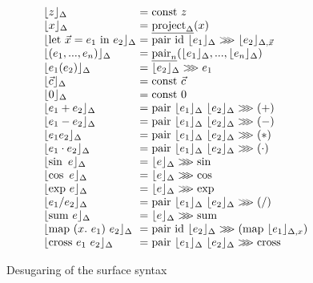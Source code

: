 \documentclass[preprint]{sigplanconf}
\newcommand{\comp}{\mathrel{>\kern-0.45em>\kern-0.45em>}}
\newcommand{\elab}[1]{\lfloor #1 \rfloor}
\theoremstyle{examplestyle}
\begin{document}
\begin{figure}
  \centering
  \begin{displaymath}
    \begin{array}{l@{\hspace{0.3em}}c@{\hspace{0.3em}}l}
      \elab{z}_\Delta & = & \mathrm{const}~z \\
      \elab{x}_\Delta & = & \underline{\mathrm{project}_\Delta}(x) \\
      \elab{\mathrm{let}~\vec{x} = e_1\textrm{ in }e_2}_\Delta & = & \mathrm{pair}~\mathrm{id}~\elab{e_1}_\Delta \comp \elab{e_2}_{\Delta, \vec{x}} \\
      \elab{(e_1,...,e_n)}_\Delta &=& \underline{\mathrm{pair}_n}(\elab{e_1}_\Delta, ..., \elab{e_n}_\Delta) \\
      \elab{e_1(e_2)}_\Delta &=& \elab{e_2}_\Delta \comp e_1 \\
      \elab{\vec{c}}_\Delta &=& \mathrm{const}~\vec{c} \\
      \elab{0}_\Delta &=& \mathrm{const}~0 \\
      \elab{e_1 + e_2}_\Delta &=& \mathrm{pair}~\elab{e_1}_\Delta~\elab{e_2}_\Delta \comp (+) \\
      \elab{e_1 - e_2}_\Delta &=& \mathrm{pair}~\elab{e_1}_\Delta~\elab{e_2}_\Delta \comp (-) \\
      \elab{e_1 e_2}_\Delta &=& \mathrm{pair}~\elab{e_1}_\Delta~\elab{e_2}_\Delta \comp (*) \\
      \elab{e_1 \cdot e_2}_\Delta &=& \mathrm{pair}~\elab{e_1}_\Delta~\elab{e_2}_\Delta \comp (\cdot) \\
      \elab{\sin~e}_\Delta &=& \elab{e}_\Delta \comp \sin \\
      \elab{\cos~e}_\Delta &=& \elab{e}_\Delta \comp \cos \\
      \elab{\mathrm{exp}~e}_\Delta &=& \elab{e}_\Delta \comp \mathrm{exp} \\
      \elab{e_1 / e_2}_\Delta &=& \mathrm{pair}~\elab{e_1}_\Delta~\elab{e_2}_\Delta \comp (/) \\
      \elab{\mathrm{sum}~e}_\Delta &=& \elab{e}_\Delta \comp \mathrm{sum} \\
      \elab{\mathrm{map}~(x.~e_1)~e_2}_\Delta &=& \mathrm{pair}~\mathrm{id}~\elab{e_2}_\Delta \comp (\mathrm{map}~\elab{e_1}_{\Delta,x}) \\
      \elab{\mathrm{cross}~e_1~e_2}_\Delta &=& \mathrm{pair}~\elab{e_1}_\Delta~\elab{e_2}_\Delta \comp \mathrm{cross}
    \end{array}
  \end{displaymath}
  \caption{Desugaring of the surface syntax}
  \label{fig:desugar}
\end{figure}
\end{document}
